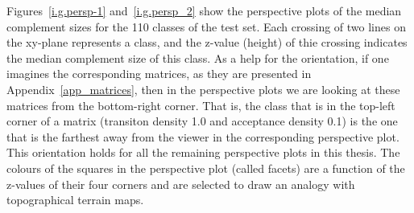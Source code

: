 Figures~\ref{i.g.persp-1} and~\ref{i.g.persp_2} show the perspective plots of the median complement sizes for the 110 classes of the \goal{} test set. Each crossing of two lines on the xy-plane represents a class, and the z-value (height) of thie crossing indicates the median complement size of this class. As a help for the orientation, if one imagines the corresponding matrices, as they are presented in Appendix~\ref{app_matrices}, then in the perspective plots we are looking at these matrices from the bottom-right corner. That is, the class that is in the top-left corner of a matrix (transiton density 1.0 and acceptance density 0.1) is the one that is the farthest away from the viewer in the corresponding perspective plot. This orientation holds for all the remaining perspective plots in this thesis. The colours of the squares in the perspective plot (called facets) are a function of the z-values of their four corners and are selected to draw an analogy with topographical terrain maps.

\newcommand{\perspwidth}{0.475}

